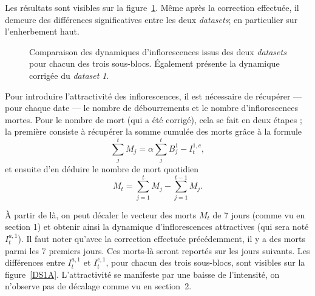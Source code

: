 \documentclass[a4paper, 11pt]{article}
\begin{document}
Les résultats sont visibles sur la figure~\ref{DS1}. Même après la correction effectuée, il demeure des différences significatives entre les deux \textit{datasets}; en particulier sur l'enherbement haut.

%  
% 

\begin{figure}[ht]
 \centering
 \caption{Comparaison des dynamiques d'inflorescences issus des deux \textit{datasets} pour chacun des trois sous-blocs. Également présente la dynamique corrigée du \textit{dataset 1}.}
 \label{DS1}
\end{figure}




Pour introduire l'attractivité des inflorescences, il est nécessaire de récupérer --- pour chaque date --- le nombre de débourrements et le nombre d'inflorescences mortes. Pour le nombre de mort (qui a été corrigé), cela se fait en deux étapes ; la première consiste à récupérer la somme cumulée des morts grâce à la formule
$$\sum_j^t M_j = \alpha\sum_j^t B_j^1 - I_t^{1,c},$$
et ensuite d'en déduire le nombre de mort quotidien 
$$M_t = \sum_{j=1}^t M_j - \sum_{j=1}^{t-1} M_j.$$

À partir de là, on peut décaler le vecteur des morts $M_t$ de 7 jours (comme vu en section 1) et obtenir ainsi la dynamique d'inflorescences attractives (qui sera noté $I_t^{a, 1}$). Il faut noter qu'avec la correction effectuée précédemment, il y a des morts parmi les 7 premiers jours. Ces morts-là seront reportés sur les jours suivants.
Les différences entre $I_t^{a, 1}$ et $I_t^{c, 1}$, pour chacun des trois sous-blocs, sont visibles sur la figure~\ref{DS1A}. L'attractivité se manifeste par une baisse de l'intensité, on n'observe pas de décalage comme vu en section~2.
\end{document}
